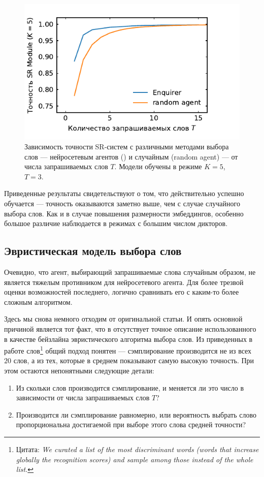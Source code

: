 \begin{figure}[htb]
    \centering
    \includegraphics[scale=1.0]{../plots/word_sweep_enq.pdf}
    \caption{Зависимость точности SR-систем с различными методами выбора слов
    --- нейросетевым агентов (\enquirer{}) и случайным (random agent) --- от
    числа запрашиваемых слов $T$. Модели обучены в режиме $K = 5$, $T = 3$.}
\end{figure}

Приведенные результаты свидетельствуют о том, что \enquirer{} действительно
успешно обучается --- точность оказываются заметно выше, чем с случае
случайного выбора слов. Как и в случае повышения размерности эмбеддингов,
особенно большое различие наблюдается в режимах с большим числом дикторов.

\subsection{Эвристическая модель выбора слов}

Очевидно, что агент, выбирающий запрашиваемые слова случайным образом, не
является тяжелым противником для нейросетевого агента. Для более трезвой
оценки возможностей последнего, логично сравнивать его с каким-то более сложным
алгоритмом.

Здесь мы снова немного отходим от оригинальной статьи. И опять основной
причиной является тот факт, что в \citeisr{} отсутствует точное описание
использованного в качестве бейзлайна эвристического алгоритма выбора слов.
Из приведенных в работе слов\footnote{
    Цитата: \textit{We curated a list of the most discriminant
    words (words that increase globally the recognition scores)
    and sample among those instead of the whole list.}
}
общий подход понятен --- сэмплирование производится не из всех $20$ слов, а
из тех, которые в среднем показывают самую высокую точность. При этом остаются
непонятными следующие детали:
\begin{enumerate}
    \item Из скольки слов производится сэмплирование, и меняется ли это число
    в зависимости от числа запрашиваемых слов $T$?
    \item Производится ли сэмплирование равномерно, или вероятность выбрать
    слово пропорциональна достигаемой при выборе этого слова средней точности?
\end{enumerate}

